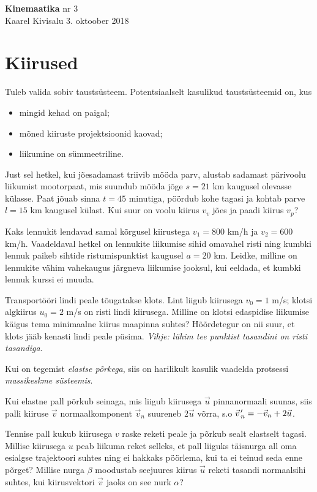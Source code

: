 \documentclass[a4paper,11pt,twocolumn]{article}
\begin{document}
{\huge \textbf{Kinemaatika} \hfill \normalsize {nr 3}} \\
{Kaarel Kivisalu \hfill 3. oktoober 2018}

\section{Kiirused}
Tuleb valida sobiv taustsüsteem. Potentsiaalselt kasulikud taustsüsteemid on, kus
{\setlength{\parskip}{0em}
\begin{itemize}[noitemsep,nolistsep]
	\item mingid kehad on paigal;
	\item mõned kiiruste projektsioonid kaovad;
	\item liikumine on sümmeetriline.
\end{itemize}}
\begin{question}[Piirk 2015, P2]
	Just sel hetkel, kui jõesadamast triivib mööda parv, alustab sadamast pärivoolu liikumist mootorpaat, mis suundub mööda jõge $ s = 21 $ km kaugusel olevasse külasse. Paat jõuab sinna $ t = 45 $ minutiga, pöördub kohe tagasi ja kohtab parve $ l=15 $ km kaugusel külast. Kui suur on voolu kiirus $ v_v $ jões ja paadi kiirus $ v_p $?
\end{question}
\begin{question}[Piirk 2014, P9][kin1][4.4cm]
	Kaks lennukit lendavad samal kõrgusel kiirustega $ v_1 = 800 $ km/h ja $ v_2 = 600 $ km/h. Vaadeldaval hetkel on lennukite liikumise sihid omavahel risti ning kumbki lennuk paikeb sihtide ristumispunktist kaugusel $ a = 20 $ km. Leidke, milline on lennukite vähim vahekaugus järgneva liikumise jooksul, kui eeldada, et kumbki lennuk kurssi ei muuda.
\end{question}
\begin{question}
	Transportööri lindi peale tõugatakse klots. Lint liigub kiirusega $ v_0= 1 $ m/s; klotsi algkiirus $ u_0= 2 $ m/s on risti lindi kiirusega. Milline on klotsi edaspidise liikumise käigus tema minimaalne kiirus maapinna suhtes? Hõõrdetegur on nii suur, et klots jääb kenasti lindi peale püsima. \textit{Vihje: lühim tee punktist tasandini on risti tasandiga.}
\end{question}
Kui on tegemist \textit{elastse põrkega}, siis on harilikult kasulik vaadelda protsessi \textit{massikeskme süsteemis}.

Kui elastne pall põrkub seinaga, mis liigub kiirusega $ \vec{u} $ pinnanormaali suunas, siis palli kiiruse $ \vec{v} $ normaalkomponent $ \vec{v}_n $ suureneb $ 2\vec{u} $ võrra, s.o $\pvec{v}'_n=-\vec{v}_n+2\vec{u} $.
\begin{question}[NSVL ol. 1983, 9. kl]
	Tennise pall kukub kiirusega $ v $ raske reketi peale ja põrkub sealt elastselt tagasi. Millise kiirusega $ u $ peab liikuma reket selleks, et pall liiguks täisnurga all oma esialgse trajektoori suhtes ning ei hakkaks pöörlema, kui ta ei teinud seda enne põrget? Millise nurga $ \beta $ moodustab seejuures kiirus $ \vec{u} $ reketi tasandi normaalsihi suhtes, kui kiirusvektori $ \vec{v} $ jaoks on see nurk $ \alpha $?
\end{question}
\end{document}
